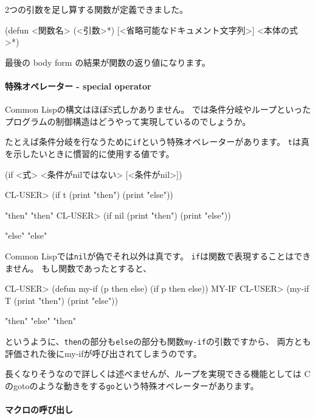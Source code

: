 \documentclass[mingoth,a4paper]{jsarticle}
\begin{document}
2つの引数を足し算する関数が定義できました。


\begin{commandline}
(defun <関数名> (<引数>*) [<省略可能なドキュメント文字列>] <本体の式>*)
\end{commandline}

最後の body form の結果が関数の返り値になります。


\paragraph{特殊オペレーター - special operator}

Common Lispの構文はほぼS式しかありません。
では条件分岐やループといったプログラムの制御構造はどうやって実現しているのでしょうか。

たとえば条件分岐を行なうために\verb|if|という特殊オペレーターがあります。
\verb|t|は真を示したいときに慣習的に使用する値です。

\begin{commandline}
(if <式> <条件がnilではない> [<条件がnil>])
\end{commandline}

\begin{commandline}
CL-USER> (if t (print "then") (print "else"))

"then"
"then"
CL-USER> (if nil (print "then") (print "else"))

"else"
"else"
\end{commandline}

Common Lispでは\verb|nil|が偽でそれ以外は真です。
\verb|if|は関数で表現することはできません。
もし関数であったとすると、

\begin{commandline}
CL-USER> (defun my-if (p then else) (if p then else))
MY-IF
CL-USER> (my-if T (print "then") (print "else"))

"then"
"else"
"then"
\end{commandline}

というように、\verb|then|の部分も\verb|else|の部分も関数\verb|my-if|の引数ですから、
両方とも評価された後にmy-ifが呼び出されてしまうのです。

長くなりそうなので詳しくは述べませんが、ループを実現できる機能としては
Cのgotoのような動きをする\verb|go|という特殊オペレーターがあります。

\paragraph{マクロの呼び出し}
\end{document}
